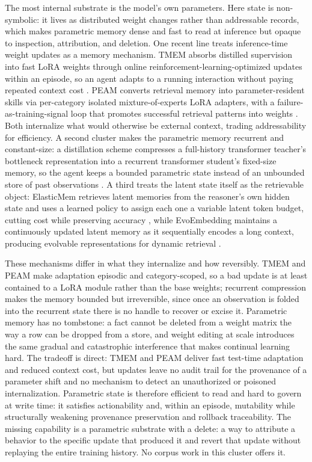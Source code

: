 The most internal substrate is the model's own parameters. Here state is non-symbolic: it lives as distributed weight changes rather than addressable records, which makes parametric memory dense and fast to read at inference but opaque to inspection, attribution, and deletion. One recent line treats inference-time weight updates as a memory mechanism. TMEM absorbs distilled supervision into fast LoRA weights through online reinforcement-learning-optimized updates within an episode, so an agent adapts to a running interaction without paying repeated context cost \citep{ren2026tmem}. PEAM converts retrieval memory into parameter-resident skills via per-category isolated mixture-of-experts LoRA adapters, with a failure-as-training-signal loop that promotes successful retrieval patterns into weights \citep{guo2026peam}. Both internalize what would otherwise be external context, trading addressability for efficiency. A second cluster makes the parametric memory recurrent and constant-size: a distillation scheme compresses a full-history transformer teacher's bottleneck representation into a recurrent transformer student's fixed-size memory, so the agent keeps a bounded parametric state instead of an unbounded store of past observations \citep{weinzaepfel2026recurrentmem}. A third treats the latent state itself as the retrievable object: ElasticMem retrieves latent memories from the reasoner's own hidden state and uses a learned policy to assign each one a variable latent token budget, cutting cost while preserving accuracy \citep{feng2026elasticmem}, while EvoEmbedding maintains a continuously updated latent memory as it sequentially encodes a long context, producing evolvable representations for dynamic retrieval \citep{nie2026evoembedding}.

These mechanisms differ in what they internalize and how reversibly. TMEM and PEAM make adaptation episodic and category-scoped, so a bad update is at least contained to a LoRA module rather than the base weights; recurrent compression \citep{weinzaepfel2026recurrentmem} makes the memory bounded but irreversible, since once an observation is folded into the recurrent state there is no handle to recover or excise it. Parametric memory has no tombstone: a fact cannot be deleted from a weight matrix the way a row can be dropped from a store, and weight editing at scale introduces the same gradual and catastrophic interference that makes continual learning hard. The tradeoff is direct: TMEM and PEAM deliver fast test-time adaptation and reduced context cost, but updates leave no audit trail for the provenance of a parameter shift and no mechanism to detect an unauthorized or poisoned internalization. Parametric state is therefore efficient to read and hard to govern at write time: it satisfies actionability and, within an episode, mutability while structurally weakening provenance preservation and rollback traceability. The missing capability is a parametric substrate with a delete: a way to attribute a behavior to the specific update that produced it and revert that update without replaying the entire training history. No corpus work in this cluster offers it.

